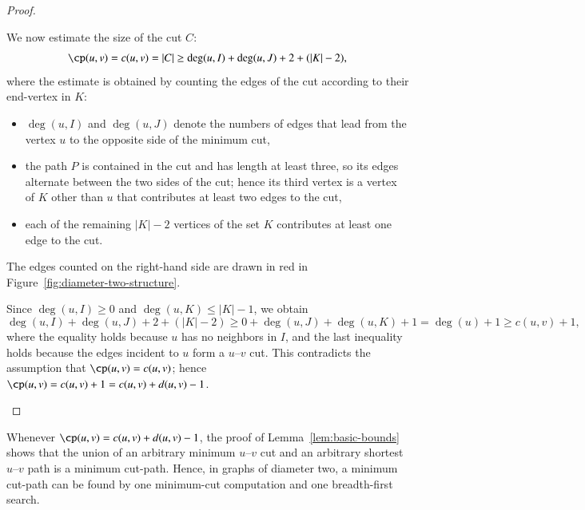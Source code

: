 \begin{proof}
\begin{enumerate}
We now estimate the size of the cut $C$:
\[
\cp(u, v) = c(u,v) = |C| \geq \deg(u, I) + \deg(u, J) + 2 + (|K| - 2),
\]
where the estimate is obtained by counting the edges of the cut according to their end-vertex in $K$:
\begin{itemize}
    \item $\deg(u, I)$ and $\deg(u, J)$ denote the numbers of edges that lead from the vertex $u$ to the opposite side of the minimum cut,

    \item the path $P$ is contained in the cut and has length at least three, so its edges alternate between the two sides of the cut; hence its third vertex is a vertex of $K$ other than $u$ that contributes at least two edges to the cut,

    \item each of the remaining $|K| - 2$ vertices of the set $K$ contributes at least one edge to the cut.
\end{itemize}


The edges counted on the right-hand side are drawn in red in Figure~\ref{fig:diameter-two-structure}.

Since $\deg(u, I) \geq 0$ and $\deg(u, K) \leq |K| - 1$, we obtain
\[
\deg(u, I) + \deg(u, J) + 2 + (|K| - 2) \geq
0 + \deg(u, J) + \deg(u, K) + 1 = \deg(u) + 1 \geq c(u, v) + 1,
\]
where the equality holds because $u$ has no neighbors in $I$, and the last inequality holds because the edges incident to $u$ form a $u$--$v$ cut.
This contradicts the assumption that $\cp(u, v) = c(u, v)$; hence $\cp(u, v) = c(u, v) + 1 = c(u, v) + d(u, v) - 1$.\qedhere
\end{enumerate}
\end{proof}

\begin{remark}
\label{rem:algorithm}
Whenever $\cp(u, v) = c(u, v) + d(u, v) - 1$, the proof of Lemma~\ref{lem:basic-bounds} shows that the union of an arbitrary minimum $u$--$v$ cut and an arbitrary shortest $u$--$v$ path is a minimum cut-path.
Hence, in graphs of diameter two, a minimum cut-path can be found by one minimum-cut computation and one breadth-first search.
\end{remark}

